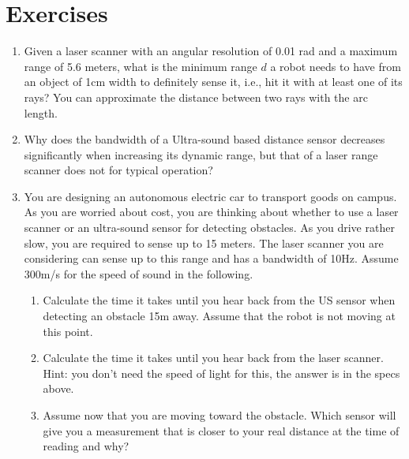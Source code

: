 \section*{Exercises}\small
\begin{enumerate}
\item Given a laser scanner with an angular resolution of 0.01 rad and a maximum range of 5.6 meters, what is the minimum range $d$ a robot needs to have from an object of 1cm width to definitely sense it, i.e., hit it with at least one of its rays? You can approximate the distance between two rays with the arc length.
\item Why does the bandwidth of a Ultra-sound based distance sensor decreases significantly when increasing its dynamic range, but that of a laser range scanner does not for typical operation?
\item You are designing an autonomous electric car to transport goods on campus. As you are worried about cost, you are thinking about whether to use a laser scanner or an ultra-sound sensor for detecting obstacles. As you drive rather slow, you are required to sense up to 15 meters. The laser scanner you are considering can sense up to this range and has a bandwidth of 10Hz. Assume 300m/s for the speed of sound in the following.
\begin{enumerate}
\item Calculate the time it takes until you hear back from the US sensor when detecting an obstacle 15m away. Assume that the robot is not moving at this point.
\item Calculate the time it takes until you hear back from the laser scanner. Hint: you don’t need the speed of light for this, the answer is in the specs above.
\item Assume now that you are moving toward the obstacle. Which sensor will give you a measurement that is closer to your real distance at the time of reading and why?
\end{enumerate}
\end{enumerate}\normalsize
